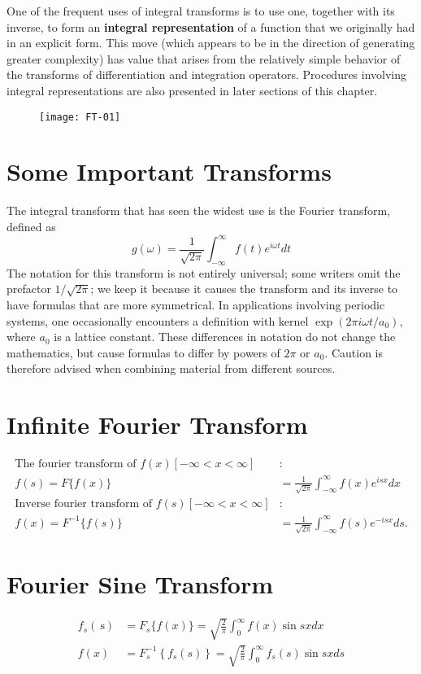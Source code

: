 One of the frequent uses of integral transforms is to use one, together with its inverse, to form an \textbf{integral representation} of a function that we originally had in an explicit form. This move (which appears to be in the direction of generating greater complexity) has value that arises from the relatively simple behavior of the transforms of differentiation and integration operators. Procedures involving integral representations are also presented in later sections of this chapter.
\begin{figure}[H]
	\centering
	\texttt{[image: FT-01]}
\end{figure}
\section{Some Important Transforms}
The integral transform that has seen the widest use is the Fourier transform, defined as
\begin{equation}
g(\omega)=\frac{1}{\sqrt{2 \pi}} \int_{-\infty}^{\infty} f(t) e^{i \omega t} d t
\end{equation}
The notation for this transform is not entirely universal; some writers omit the prefactor $1 / \sqrt{2 \pi}$; we keep it because it causes the transform and its inverse to have formulas that are more symmetrical. In applications involving periodic systems, one occasionally encounters a definition with kernel $\exp \left(2 \pi i \omega t / a_{0}\right)$, where $a_{0}$ is a lattice constant. These differences in notation do not change the mathematics, but cause formulas to differ by powers of $2 \pi$ or $a_{0}$. Caution is therefore advised when combining material from different sources.\\
\section{Infinite Fourier Transform}
\begin{align*}
\text{The fourier transform of }f(x)[-\infty<x<\infty] &:\\
f(s)=F\{f(x)\}&=\frac{1}{\sqrt{2 \pi}} \int_{-\infty}^{\infty} f(x) e^{i s x} d x\\
\text{Inverse fourier transform of }f(s)[-\infty<x<\infty] &:\\
f(x)=F^{-1}\{f(s)\}&=\frac{1}{\sqrt{2 \pi}} \int_{-\infty}^{\infty} f(s) e^{-i s x} d s .
\end{align*}
\section{Fourier Sine Transform}
\begin{align*}
f_{s}(\mathrm{~s})&=F_{s}\{f(x)\}=\sqrt{\frac{2}{\pi}} \int_{0}^{\infty} f(x) \sin s x d x \\
f(x)&=F_{s}^{-1}\left\{f_{s}(s)\right\}=\sqrt{\frac{2}{\pi}} \int_{0}^{\infty} f_{s}(s) \sin s x d s
\end{align*}
